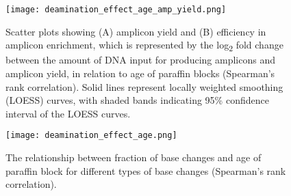 \begin{figure}[H]
	\centering
	\texttt{[image: deamination\_effect\_age\_amp\_yield.png]}
	\caption[Scatter plots showing (A) amplicon yield and (B) efficiency in amplicon enrichment, which is represented by the log\textsubscript{2} fold change between the amount of DNA input for producing amplicons and amplicon yield, in relation to age of paraffin blocks (Spearman's rank correlation).]{Scatter plots showing (A) amplicon yield and (B) efficiency in amplicon enrichment, which is represented by the log\textsubscript{2} fold change between the amount of DNA input for producing amplicons and amplicon yield, in relation to age of paraffin blocks (Spearman's rank correlation). Solid lines represent locally weighted smoothing (LOESS) curves, with shaded bands indicating 95\% confidence interval of the LOESS curves.}
	\label{fig:deamination_effect_age_amp_yield}
\end{figure}


\begin{figure}[H]
	\centering
	\texttt{[image: deamination\_effect\_age.png]}
	\caption{The relationship between fraction of base changes and age of paraffin block for different types of base changes (Spearman's rank correlation).}
	\label{fig:deamination_effect_age}
\end{figure}



